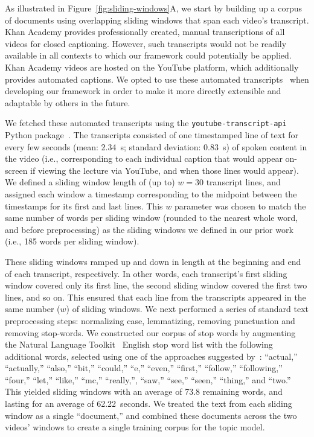 \documentclass[10pt]{article}
\begin{document}
As illustrated in Figure~\ref{fig:sliding-windows}A, we start by building up a
corpus of documents using overlapping sliding windows that span each video's
transcript. Khan Academy provides professionally created, manual transcriptions
of all videos for closed captioning. However, such transcripts would not be
readily available in all contexts to which our framework could potentially be
applied. Khan Academy videos are hosted on the YouTube platform, which
additionally provides automated captions. We opted to use these automated
transcripts~\citep[which, in prior work, we have found to be of sufficiently
near-human quality to yield reliable data in behavioral
studies; ][]{ZimaEtal18} when developing our framework in order to make
it more directly extensible and adaptable by others in the future.

We fetched these automated transcripts using the
\texttt{youtube-transcript-api} Python package~\citep{Depo18}. The transcripts
consisted of one timestamped line of text for every few seconds (mean: 2.34~s;
standard deviation: 0.83~s) of spoken content in the video (i.e., corresponding
to each individual caption that would appear on-screen if viewing the lecture
via YouTube, and when those lines would appear). We defined a sliding window
length of (up to) $w = 30$ transcript lines, and assigned each window a
timestamp corresponding to the midpoint between the timestamps for its first
and last lines. This $w$ parameter was chosen to match the same number of words
per sliding window (rounded to the nearest whole word, and before
preprocessing) as the sliding windows we defined in our prior
work~\citep{HeusEtal21} (i.e., 185 words per sliding window).

These sliding windows ramped up and down in length at the beginning and end of
each transcript, respectively. In other words, each transcript's first sliding
window covered only its first line, the second sliding window covered the first
two lines, and so on. This ensured that each line from the transcripts appeared
in the same number ($w$) of sliding windows. We next performed a series of
standard text preprocessing steps: normalizing case, lemmatizing, removing
punctuation and removing stop-words. We constructed our corpus of stop words by
augmenting the Natural Language Toolkit~\citep[NLTK; ][]{BirdEtal09} English
stop word list with the following additional words, selected using one of the
approaches suggested by~\citep{BoydEtal14}: ``actual,'' ``actually,'' ``also,''
``bit,'' ``could,'' ``e,'' ``even,'' ``first,'' ``follow,'' ``following,''
``four,'' ``let,'' ``like,'' ``mc,'' ``really,'', ``saw,'' ``see,'' ``seen,''
``thing,'' and ``two.'' This yielded sliding windows with an average of 73.8
remaining words, and lasting for an average of 62.22~seconds. We treated the
text from each sliding window as a single ``document,'' and combined these
documents across the two videos' windows to create a single training corpus for
the topic model.
\end{document}
